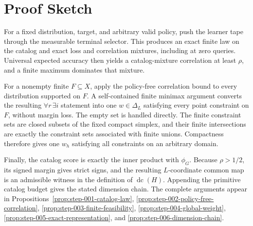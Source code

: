 \section{Proof Sketch}\label{sec:proof-sketch}

For a fixed distribution, target, and arbitrary valid policy, push the learner
tape through the measurable terminal selector.  This produces an exact finite
law on the catalog and exact loss and correlation mixtures, including at zero
queries.  Universal expected accuracy then yields a catalog-mixture
correlation at least $\rho$, and a finite maximum dominates that mixture.

For a nonempty finite $F\subseteq X$, apply the policy-free correlation bound
to every distribution supported on $F$.  A self-contained finite minimax
argument converts the resulting $\forall r\,\exists i$ statement into one
$w\in\Delta_L$ satisfying every point constraint on $F$, without margin
loss.  The empty set is handled directly.  The finite constraint sets are
closed subsets of the fixed compact simplex, and their finite intersections
are exactly the constraint sets associated with finite unions.  Compactness
therefore gives one $w_h$ satisfying all constraints on an arbitrary domain.

Finally, the catalog score is exactly the inner product with $\phi_G$.
Because $\rho>1/2$, its signed margin gives strict signs, and the resulting
$L$-coordinate common map is an admissible witness in the definition of
$\operatorname{dc}(H)$.  Appending the primitive catalog budget gives the
stated dimension chain.  The complete arguments appear in
Propositions~\ref{prop:step-001-catalog-law},
\ref{prop:step-002-policy-free-correlation},
\ref{prop:step-003-finite-feasibility},
\ref{prop:step-004-global-weight},
\ref{prop:step-005-exact-representation}, and
\ref{prop:step-006-dimension-chain}.
